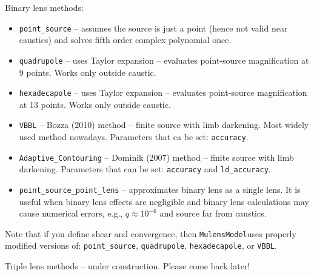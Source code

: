 \documentclass[12pt]{article}
\newcommand\MM{{\tt MulensModel}}
\begin{document}
\bigskip\bigskip
Binary lens methods:
\begin{itemize}
\item {\tt point\_source} -- assumes the source is just a point (hence not valid near caustics) and solves fifth order complex polynomial once.
\item {\tt quadrupole} -- uses Taylor expansion -- evaluates point-source magnification at 9 points.  Works only outside caustic.
\item {\tt hexadecapole} -- uses Taylor expansion -- evaluates point-source magnification at 13 points.  Works only outside caustic.
\item {\tt VBBL} -- Bozza (2010) method -- finite source with limb darkening.  Most widely used method nowadays.  Parameters that ca be set: {\tt accuracy}.
\item {\tt Adaptive\_Contouring} -- Dominik (2007) method -- finite source with limb darkening.  Parameters that can be set: {\tt accuracy} and {\tt ld\_accuracy}.
\item {\tt point\_source\_point\_lens} -- approximates binary lens as a single lens.  It is useful when binary lens effects are negligible and binary lens calculations may cause numerical errors, e.g., $q\approx10^{-6}$ and source far from caustics.  
\end{itemize}
Note that if you define shear and convergence, then \MM uses properly modified versions of: {\tt point\_source}, {\tt quadrupole}, {\tt hexadecapole}, or {\tt VBBL}.

\bigskip\bigskip
Triple lens methods -- under construction.  Please come back later!
\end{document}
